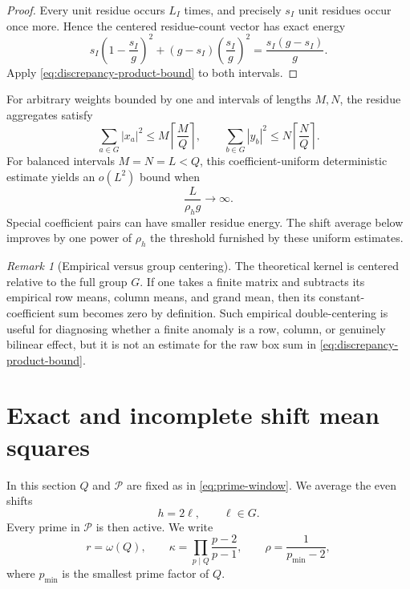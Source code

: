 \documentclass[11pt]{article}
\theoremstyle{definition}
\theoremstyle{remark}
\newtheorem{remark}[theorem]{Remark}
\newcommand{\cP}{\mathcal P}
\begin{document}
\begin{proof}
Every unit residue occurs $L_I$ times, and precisely $s_I$ unit residues occur once more.  Hence the centered residue-count vector has exact energy
\[
 s_I\left(1-\frac{s_I}{g}\right)^2
 +(g-s_I)\left(\frac{s_I}{g}\right)^2
 =\frac{s_I(g-s_I)}g.
\]
Apply \eqref{eq:discrepancy-product-bound} to both intervals.
\end{proof}

For arbitrary weights bounded by one and intervals of lengths $M,N$, the residue aggregates satisfy
\begin{equation}\label{eq:aggregate-energy-bound}
 \sum_{a\in G}|x_a|^2
 \le M\left\lceil\frac MQ\right\rceil,
 \qquad
 \sum_{b\in G}|y_b|^2
 \le N\left\lceil\frac NQ\right\rceil.
\end{equation}
For balanced intervals $M=N=L<Q$, this coefficient-uniform deterministic estimate yields an $o(L^2)$ bound when
\[
 \frac{L}{\rho_h g}\longrightarrow\infty.
\]
Special coefficient pairs can have smaller residue energy.  The shift average below improves by one power of $\rho_h$ the threshold furnished by these uniform estimates.

\begin{remark}[Empirical versus group centering]\label{rem:empirical-centering}
The theoretical kernel is centered relative to the full group $G$.  If one takes a finite matrix and subtracts its empirical row means, column means, and grand mean, then its constant-coefficient sum becomes zero by definition.  Such empirical double-centering is useful for diagnosing whether a finite anomaly is a row, column, or genuinely bilinear effect, but it is not an estimate for the raw box sum in \eqref{eq:discrepancy-product-bound}.
\end{remark}

\section{Exact and incomplete shift mean squares}\label{sec:shift-means}

In this section $Q$ and $\cP$ are fixed as in \eqref{eq:prime-window}.  We average the even shifts
\begin{equation}\label{eq:fully-active-shifts}
 h=2\ell,
 \qquad \ell\in G.
\end{equation}
Every prime in $\cP$ is then active.  We write
\begin{equation}\label{eq:global-kappa-rho}
 r=\omega(Q),
 \qquad
 \kappa=\prod_{p\mid Q}\frac{p-2}{p-1},
 \qquad
 \rho=\frac1{p_{\min}-2},
\end{equation}
where $p_{\min}$ is the smallest prime factor of $Q$.
\end{document}
